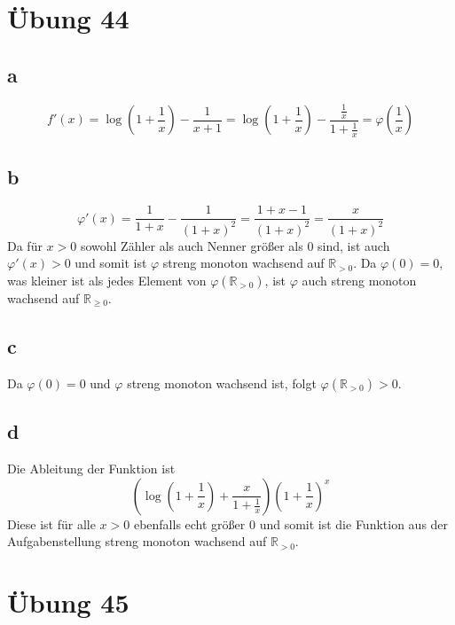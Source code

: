 \documentclass[a4paper,10pt]{article}
\begin{document}
\section*{Übung 44}

\subsection*{a}

\begin{equation}
 f'(x) = \log(1 + \frac{1}{x}) - \frac{1}{x + 1} = \log (1 + \frac{1}{x}) - \frac{\frac{1}{x}}{1 + \frac{1}{x}} = \varphi \left(\frac{1}{x}\right)
\end{equation}

\subsection*{b}

\begin{equation}
 \varphi'(x) = \frac{1}{1 + x} - \frac{1}{(1 + x)^2} = \frac{1 + x - 1}{(1 + x)^2} = \frac{x}{(1 + x)^2}
\end{equation}
Da für $x > 0$ sowohl Zähler als auch Nenner größer als 0 sind, ist auch $\varphi'(x) > 0$ und somit ist $\varphi$ streng monoton wachsend auf $\mathbb{R}_{> 0}$.
Da $\varphi(0) = 0$, was kleiner ist als jedes Element von $\varphi(\mathbb{R}_{> 0})$, ist $\varphi$ auch streng monoton wachsend auf $\mathbb{R}_{\ge 0}$.

\subsection*{c}

Da $\varphi(0) = 0$ und $\varphi$ streng monoton wachsend ist, folgt $\varphi(\mathbb{R}_{> 0}) > 0$.

\subsection*{d}

Die Ableitung der Funktion ist
\begin{equation}
 \left( \log \left( 1 + \frac{1}{x} \right) + \frac{x}{1 + \frac{1}{x}} \right) \left( 1 + \frac{1}{x} \right)^x
\end{equation}
Diese ist für alle $x > 0$ ebenfalls echt größer $0$ und somit ist die Funktion aus der Aufgabenstellung streng monoton wachsend auf $\mathbb{R}_{> 0}$.

\section*{Übung 45}
\end{document}
